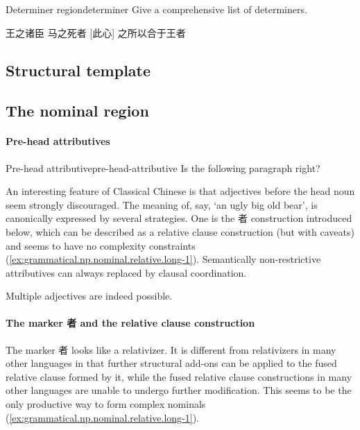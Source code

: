 \documentclass[UTF8, a4paper, oneside, scheme=plain, 12pt]{ctexrep}
\newcommand{\translate}[1]{`#1'}
\begin{document}
\begin{todobox}{Determiner region}{determiner}
    Give a comprehensive list of determiners.
\end{todobox}

\begin{exe}
    \ex\label{ex:grammatical.np.template.gen.1} 王之诸臣
    \ex\label{ex:grammatical.np.template.gen.2} 马之死者
    \ex\label{ex:grammatical.np.template.dem.1} [此心] 之所以合于王者
\end{exe}

\subsection{Structural template}\label{sec:grammatical.noun-phrase.linear}

\subsection{The nominal region} 

\paragraph*{Pre-head attributives} 

\begin{todobox}{Pre-head attributive}{pre-head-attributive}
Is the following paragraph right?

An interesting feature of Classical Chinese is 
that adjectives before the head noun seem strongly discouraged. 
The meaning of, say, \translate{an ugly big old bear},
is canonically expressed by several strategies.
One is the 者 construction introduced below, 
which can be described as a relative clause construction (but with caveats)
and seems to have no complexity constraints
(\ref{ex:grammatical.np.nominal.relative.long-1}).
Semantically non-restrictive attributives can always replaced by clausal coordination.

Multiple adjectives are indeed possible.


\end{todobox}

\paragraph*{The marker 者 and the relative clause construction} 
\label{sec:grammatical.noun-phrase.determinative-relative}
The marker 者 looks like a relativizer.
It is different from relativizers in many other languages in that
further structural add-ons can be applied to the fused relative clause formed by it,
while the fused relative clause constructions in many other languages 
are unable to undergo further modification.
This seems to be the only productive way to form complex nominals 
(\ref{ex:grammatical.np.nominal.relative.long-1}).
\end{document}
